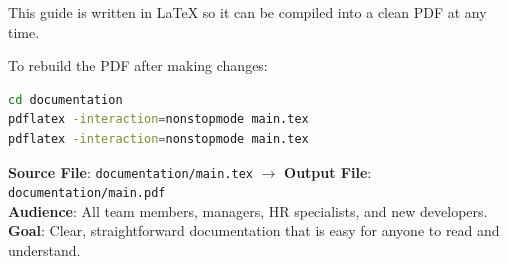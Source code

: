 \documentclass[a4paper,11pt]{article}
\begin{document}
This guide is written in LaTeX so it can be compiled into a clean PDF at any time.

To rebuild the PDF after making changes:
\begin{lstlisting}[language=bash]
cd documentation
pdflatex -interaction=nonstopmode main.tex
pdflatex -interaction=nonstopmode main.tex
\end{lstlisting}

\begin{tipbox}[Summary]
\textbf{Source File}: \texttt{documentation/main.tex} $\rightarrow$ \textbf{Output File}: \texttt{documentation/main.pdf} \\
\textbf{Audience}: All team members, managers, HR specialists, and new developers. \\
\textbf{Goal}: Clear, straightforward documentation that is easy for anyone to read and understand.
\end{tipbox}
\end{document}
